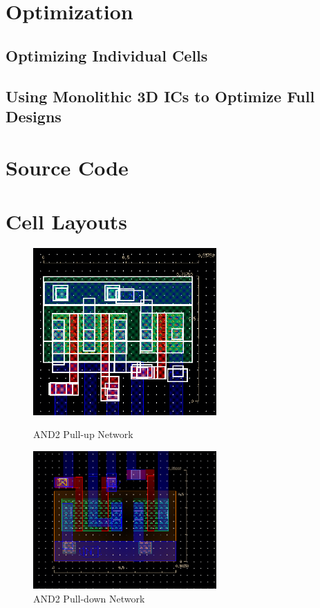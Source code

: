 \documentclass{article}
\begin{document}
\section{Optimization}
\subsection{Optimizing Individual Cells}
\subsection{Using Monolithic 3D ICs to Optimize Full Designs}

\paragraph{}


\newpage
\appendix 
\section{Source Code}
\section{Cell Layouts}


\begin{figure}[H]
\centering
\parbox{8cm}{
\includegraphics[width=7cm]{final_cells/AND2_PMOS}
  \caption{AND2 Pull-up Network}
\label{fig:AND2_pmos}}
\qquad
\begin{minipage}{7cm}
\includegraphics[width=7cm]{final_cells/AND2_NMOS}
  \caption{AND2 Pull-down Network}
\label{fig:AND2_nmos}
\end{minipage}
\end{figure}
\end{document}
